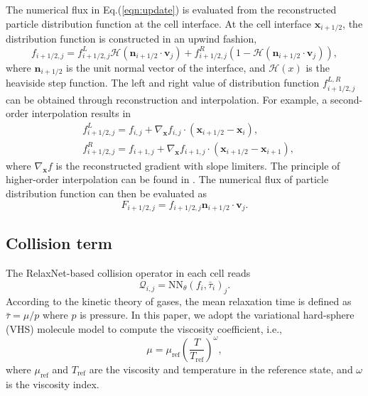 \documentclass[preprint,3p,12pt,sort&compress]{elsarticle}
\begin{document}
The numerical flux in Eq.(\ref{eqn:update}) is evaluated from the reconstructed particle distribution function at the cell interface.
At the cell interface $\mathbf x_{i+1/2}$, the distribution function is constructed in an upwind fashion,
\begin{equation}
    f_{i+1/2,j}=f_{i+1/2,j}^L \mathscr H\left(\mathbf n_{i+1/2} \cdot \mathbf v_j\right) + f_{i+1/2,j}^R (1-\mathscr H\left(\mathbf n_{i+1/2} \cdot \mathbf v_j\right)),
    \label{eqn:interface distribution}
\end{equation}
where $\mathbf n_{i+1/2}$ is the unit normal vector of the interface, and $\mathscr H(x)$ is the heaviside step function.
The left and right value of distribution function $f_{i+1/2,j}^{L,R}$ can be obtained through reconstruction and interpolation.
For example, a second-order interpolation results in
\begin{equation}
\begin{aligned}
    &f_{i+1/2,j}^L = f_{i,j} + \nabla_\mathbf x f_{i,j} \cdot (\mathbf x_{i+1/2}-\mathbf x_i), \\
    &f_{i+1/2,j}^R = f_{i+1,j} + \nabla_\mathbf x f_{i+1,j} \cdot (\mathbf x_{i+1/2}-\mathbf x_{i+1}),
\end{aligned}
\end{equation}
where $\nabla_\mathbf x f$ is the reconstructed gradient with slope limiters.
The principle of higher-order interpolation can be found in \cite{xiao2021flux}.
The numerical flux of particle distribution function can then be evaluated as
\begin{equation}
    F_{i+1/2,j}= f_{i+1/2,j} \mathbf n_{i+1/2} \cdot \mathbf v_j.
\end{equation}

\subsection{Collision term}

The RelaxNet-based collision operator in each cell reads
\begin{equation}
    \mathcal Q_{i,j} = \mathrm{NN}_\theta(f_{i},\bar\tau_i)_j.
\end{equation}
According to the kinetic theory of gases, the mean relaxation time is defined as $\bar\tau = \mu/{p}$ where $p$ is pressure.
In this paper, we adopt the variational hard-sphere (VHS) molecule model to compute the viscosity coefficient, i.e.,
\begin{equation}
    \mu = \mu_\mathrm{ref} \left(\frac{T}{T_\mathrm{ref}}\right)^\omega,
    \label{eqn:hs viscosity}
\end{equation}
where $\mu_\mathrm{ref}$ and $T_\mathrm{ref}$ are the viscosity and temperature in the reference state, and $\omega$ is the viscosity index.
\end{document}
